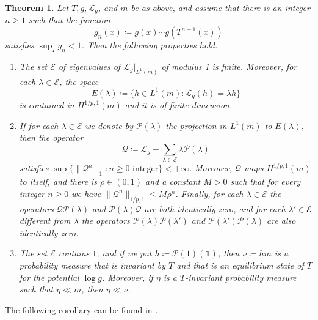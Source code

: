 \documentclass[10pt,a4paper]{amsart}
\numberwithin{equation}{section} %
\numberwithin{figure}{section} %
\newtheorem{theo}{Theorem}
\renewcommand{\=}{\coloneqq}
\begin{document}
\begin{theo}\label{keller theo}
       Let $T, g, \mathscr{L}_g$, and $m$ be as above, and assume that there is an integer $n\geq 1$ such that the function
\begin{equation*}
    g_n(x) \= g(x)\cdots g(T^{n-1}(x))
\end{equation*}
satisfies $\sup_I g_n <1$. Then the following properties hold.
\begin{enumerate}
    \item[1.] The set $\mathscr{E}$ of eigenvalues of $\mathscr{L}_g|_{L^1(m)}$ of modulus 1 is finite. Moreover, for each $\lambda \in\mathscr{E}$, the space
    \begin{equation*}
        E(\lambda)\= \{h\in L^1(m) : \mathscr{L}_g(h) = \lambda h\}
    \end{equation*}
    is contained in $H^{1/p,1}(m)$ and it is of finite dimension.
    \item[2.] If for each $\lambda\in \mathscr{E}$ we denote by $\mathscr{P}(\lambda)$ the projection in $L^1(m)$ to $E(\lambda)$, then the operator 
    \begin{equation*}
        \mathscr{Q}\= \mathscr{L}_g - \sum_{\lambda\in \mathscr{E}}\lambda\mathscr{P}(\lambda)
    \end{equation*}
    satisfies $\sup\{\lVert \mathscr{Q}^n\rVert_1: n\geq0 \text{ integer}\}<+\infty$. Moreover, $\mathscr{Q}$ maps $H^{1/p,1}(m)$ to itself, and there is $\rho\in(0,1)$ and  a constant $M>0$ such that for every integer $n\geq0$ we have $\lVert \mathscr{Q}^n\lVert_{1/p,1}\leq M\rho^n$. Finally, for each $\lambda \in \mathscr{E}$ the operators $\mathscr{Q}\mathscr{P}(\lambda)$ and $\mathscr{P}(\lambda)\mathscr{Q}$ are both identically zero, and for each $\lambda'\in \mathscr{E}$ different from $\lambda$ the operators $\mathscr{P}(\lambda)\mathscr{P}(\lambda')$ and $\mathscr{P}(\lambda')\mathscr{P}(\lambda)$ are also identically zero.
    \item[3.] The set $\mathscr{E}$ contains $1$, and if we put $h\= \mathscr{P}(1)(\boldsymbol{1})$, then $\nu\= hm$ is a probability measure that is invariant by $T$ and that is an equilibrium state of $T$ for the potential $\log g$. Moreover, if $\eta$ is a $T$-invariant probability measure such that $\eta \ll m$, then $\eta \ll \nu$.
\end{enumerate}
\end{theo}
The following corollary can be found in \cite[Corollary 4.4]{Juan1}.
\end{document}
